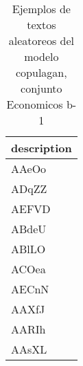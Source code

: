 \begin{table}[H]
\centering
\fontsize{8}{14}\selectfont
\caption{Ejemplos de textos aleatoreos del modelo copulagan, conjunto Economicos b-1}
\label{table-sample10-economicos-b-1-copulagan-text}
\begin{tabular}{|m{50em}|}
\hline
\rowcolor[gray]{0.8}
description \\
\hline AAeOo \\
\hline ADqZZ \\
\hline AEFVD \\
\hline ABdeU \\
\hline ABlLO \\
\hline ACOea \\
\hline AECnN \\
\hline AAXfJ \\
\hline AARIh \\
\hline AAsXL \\
\hline
\end{tabular}
\end{table}
